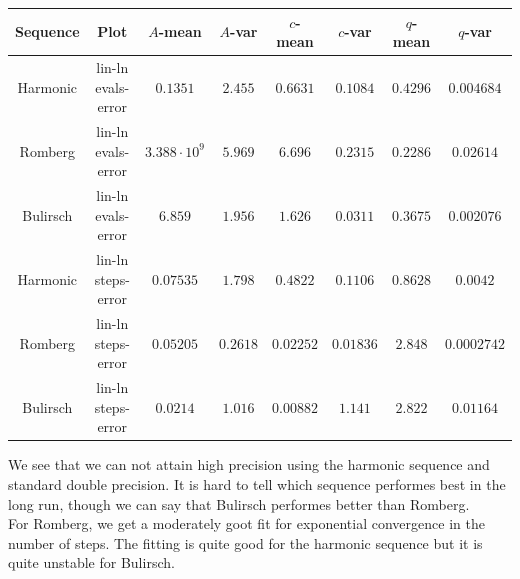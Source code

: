 \begin{table}[H]
    \centering
    \small
    \begin{tabular}{c|c||c|c|c|c|c	|c}
Sequence & Plot & \(A\)-mean & \(A\)-var & \(c\)-mean & \(c\)-var & \(q\)-mean & \(q\)-var\\\hline
\rowcolor{yellow}
Harmonic & lin-ln evals-error & \(0.1351\) & \(2.455\) & \(0.6631\) & \(0.1084\) & \(0.4296\) & \(0.004684\) \\
\rowcolor{red}
Romberg & lin-ln evals-error & \(3.388\cdot 10^{9}\) & \(5.969\) & \(6.696\) & \(0.2315\) & \(0.2286\) & \(0.02614\) \\
\rowcolor{yellow}
Bulirsch & lin-ln evals-error & \(6.859\) & \(1.956\) & \(1.626\) & \(0.0311\) & \(0.3675\) & \(0.002076\) \\
\rowcolor{yellow}
Harmonic & lin-ln steps-error & \(0.07535\) & \(1.798\) & \(0.4822\) & \(0.1106\) & \(0.8628\) & \(0.0042\) \\
\rowcolor{yellow}
Romberg & lin-ln steps-error & \(0.05205\) & \(0.2618\) & \(0.02252\) & \(0.01836\) & \(2.848\) & \(0.0002742\) \\
\rowcolor{red}
Bulirsch & lin-ln steps-error & \(0.0214\) & \(1.016\) & \(0.00882\) & \(1.141\) & \(2.822\) & \(0.01164\) \\
    \end{tabular}
    \label{tab:my_label}
\end{table}

We see that we can not attain high precision using the harmonic sequence and standard double precision. It is hard to tell which sequence performes best in the long run, though we can say that Bulirsch performes better than Romberg.\\

For Romberg, we get a moderately goot fit for exponential convergence in the number of steps. The fitting is quite good for the harmonic sequence but it is quite unstable for Bulirsch.

